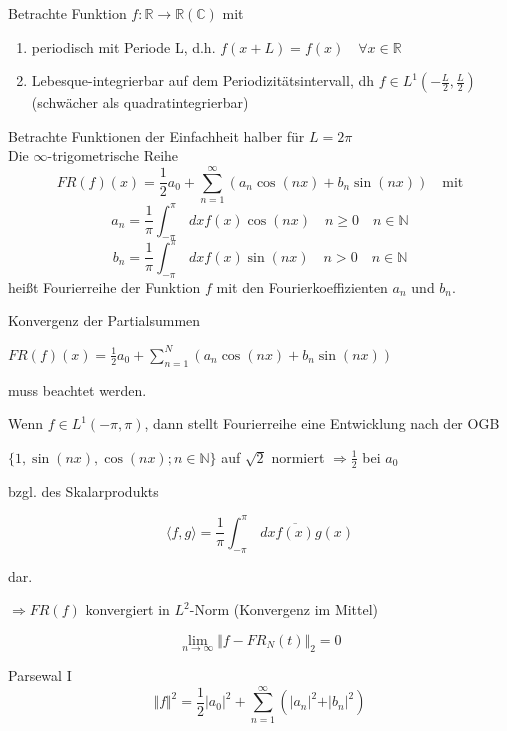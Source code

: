 Betrachte Funktion $f: \mathbb{R}\rightarrow\mathbb{R}(\mathbb{C})$ mit
\begin{enumerate}[label=(\roman*)]
	\item periodisch mit Periode L, d.h. $f(x+L) = f(x) \quad \forall x \in \mathbb{R}$
	\item Lebesque-integrierbar auf dem Periodizitätsintervall, dh $f \in L^1(-\frac{L}{2},\frac{L}{2})$ (schwächer als quadratintegrierbar)
\end{enumerate}

Betrachte Funktionen der Einfachheit halber für $L=2\pi$\\
Die $\infty$-trigometrische Reihe
$$FR(f)(x)= \frac{1}{2} a_0 + \sum_{n=1}^\infty (a_n \cos(n x) + b_n \sin(n x)) \quad \textrm{mit}$$
$$a_n = \frac{1}{\pi} \int_{-\pi}^{\pi} \,dx f(x)\cos(nx) \quad n \geq 0 \quad n \in \mathbb{N}$$
$$b_n = \frac{1}{\pi} \int_{-\pi}^{\pi} \,dx f(x)\sin(nx) \quad n>0 \quad n \in \mathbb{N}$$
heißt Fourierreihe der Funktion $f$ mit den Fourierkoeffizienten $a_n$ und $b_n$.

Konvergenz der Partialsummen

$FR(f)(x)= \frac{1}{2} a_0 + \sum_{n=1}^N (a_n \cos(n x) + b_n \sin(n x))$

muss beachtet werden.

\begin{Bem}
	Wenn $f \in L^1(-\pi,\pi)$, dann stellt Fourierreihe eine Entwicklung nach der
	OGB

	$\{1, \sin(nx), \cos(nx); n \in \mathbb{N}\}$ auf $\sqrt{2}$ normiert $\Rightarrow \frac{1}{2}$ bei $a_0$

	bzgl. des Skalarprodukts

	$$\langle f,g \rangle =  \frac{1}{\pi} \int_{-\pi}^{\pi} \,dx \overline{f(x)} g(x)$$

	dar.

	$\Rightarrow FR(f)$ konvergiert in $L^2$-Norm (Konvergenz im Mittel)

	$$\lim_{n\rightarrow \infty} {\Vert f- FR_N(t) \Vert}_2 = 0$$
\end{Bem}

\begin{Satz}{Parsewal I}
	$$\Vert f \Vert^2 = \frac{1}{2} \vert a_0 \vert^2 + \sum_{n=1}^{\infty} \left(\vert a_n \vert^2 + \vert b_n \vert^2\right)$$
\end{Satz}


